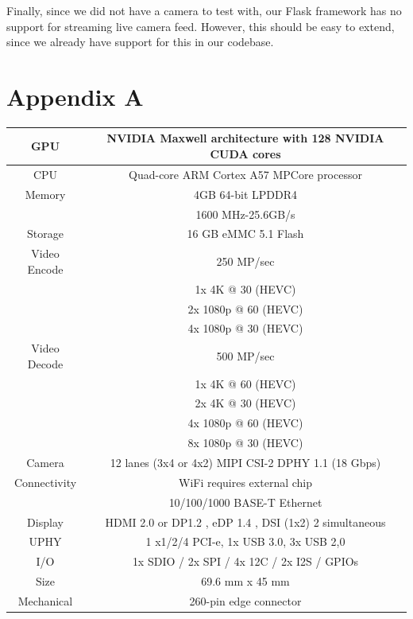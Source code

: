 \documentclass[12pt,letterpaper]{article}
\begin{document}
Finally, since we did not have a camera to test with, our Flask framework has no support for streaming live camera feed. However, this should be easy to extend, since we already have support for this in our codebase.


\pagebreak



\section*{Appendix A}
\label{sec:appa}

\begin{tabular}{|c | c|}
    \hline
    GPU & NVIDIA Maxwell architecture with 128 NVIDIA CUDA cores \\
    \hline
    CPU & Quad-core ARM Cortex A57 MPCore processor \\
    \hline
    Memory & 4GB 64-bit LPDDR4 \\
           & 1600 MHz-25.6GB/s \\
    \hline
    Storage & 16 GB eMMC 5.1 Flash \\
    \hline
    Video Encode & 250 MP/sec \\
                 & 1x 4K @ 30 (HEVC) \\
                 & 2x 1080p @ 60 (HEVC) \\
                 & 4x 1080p @ 30 (HEVC) \\
    \hline
    Video Decode & 500 MP/sec \\
                 & 1x 4K @ 60 (HEVC) \\
                 & 2x 4K @ 30 (HEVC) \\
                 & 4x 1080p @ 60 (HEVC) \\
                 & 8x 1080p @ 30 (HEVC) \\
    \hline
    Camera & 12 lanes (3x4 or 4x2) MIPI CSI-2 DPHY 1.1 (18 Gbps) \\
    \hline
    Connectivity & WiFi requires external chip \\
                 & 10/100/1000 BASE-T Ethernet \\
    \hline
    Display & HDMI 2.0 or DP1.2 , eDP 1.4 , DSI (1x2) 2 simultaneous \\
    \hline
    UPHY & 1 x1/2/4 PCI-e, 1x USB 3.0, 3x USB 2,0 \\
    \hline
    I/O & 1x SDIO / 2x SPI / 4x 12C / 2x I2S / GPIOs \\
    \hline
    Size & 69.6 mm x 45 mm \\
    \hline
    Mechanical & 260-pin edge connector \\
    \hline
\end{tabular}
\end{document}
